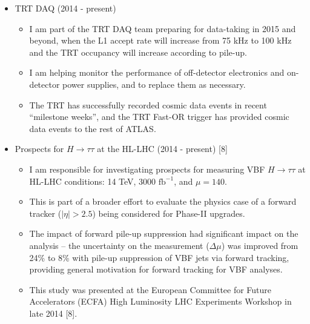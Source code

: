 \documentclass{resume2}
\begin{document}
\begin{resume}
\begin{itemize}
\item TRT DAQ (2014 - present)
  \begin{itemize}
  \item I am part of the TRT DAQ team preparing for data-taking in 2015 and beyond, when the L1 accept rate will increase from 75 kHz to 100 kHz and the TRT occupancy will increase according to pile-up.
  \item I am helping monitor the performance of off-detector electronics and on-detector power supplies, and to replace them as necessary.
  \item The TRT has successfully recorded cosmic data events in recent ``milestone weeks'', and the TRT Fast-OR trigger has provided cosmic data events to the rest of ATLAS.
  \end{itemize}

\item Prospects for $H\!\rightarrow\!\tau\tau$ at the HL-LHC (2014 - present) [8]
  \begin{itemize}
  \item I am responsible for investigating prospects for measuring VBF $H\!\rightarrow\!\tau\tau$ at HL-LHC conditions: 14 TeV, $3000\text{ fb}^{-1}$, and $\mu = 140$.
  \item This is part of a broader effort to evaluate the physics case of a forward tracker ($|\eta| > 2.5$) being considered for Phase-II upgrades.
  \item The impact of forward pile-up suppression had significant impact on the analysis -- the uncertainty on the measurement ($\Delta\mu$) was improved from 24\% to 8\% with pile-up suppression of VBF jets via forward tracking, providing general motivation for forward tracking for VBF analyses.
  \item This study was presented at the European Committee for Future Accelerators (ECFA) High Luminosity LHC Experiments Workshop in late 2014 [8].
  \end{itemize}


\end{itemize}
\end{resume}
\end{document}
